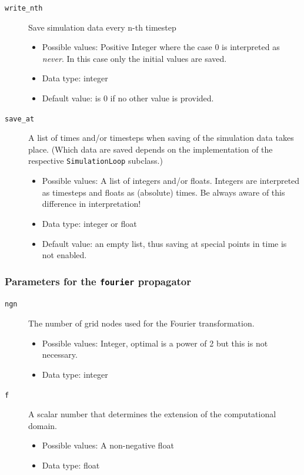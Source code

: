 \documentclass[a4paper,10pt]{report}
\begin{document}
\begin{description}
  \item[\texttt{write\_nth}] Save simulation data every n-th timestep
  \begin{itemize}
    \item Possible values: Positive Integer where the case 0 is interpreted as
          \emph{never}. In this case only the initial values are saved.
    \item Data type: integer
    \item Default value: is 0 if no other value is provided.
  \end{itemize}

  \item[\texttt{save\_at}] A list of times and/or timesteps when saving of the
    simulation data takes place. (Which data are saved depends on the implementation
    of the respective \texttt{SimulationLoop} subclass.)
  \begin{itemize}
    \item Possible values: A list of integers and/or floats. Integers are interpreted
    as timesteps and floats as (absolute) times. Be always aware of this difference
    in interpretation!
    \item Data type: integer or float
    \item Default value: an empty list, thus saving at special points in time
    is not enabled.
  \end{itemize}
\end{description}

\subsubsection{Parameters for the \texttt{fourier} propagator}

\begin{description}
  \item[\texttt{ngn}] The number of grid nodes used for the Fourier transformation.
  \begin{itemize}
    \item Possible values: Integer, optimal is a power of 2 but this is not necessary.
    \item Data type: integer
  \end{itemize}

  \item[\texttt{f}] A scalar number that determines the extension of the computational domain.
  \begin{itemize}
    \item Possible values: A non-negative float
    \item Data type: float
  \end{itemize}
\end{description}
\end{document}
